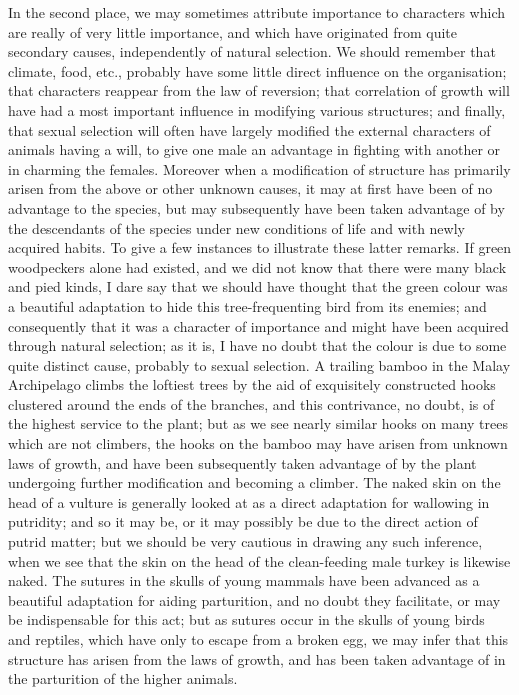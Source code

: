In the second place, we may sometimes attribute importance to characters which are really of very little importance, and which have originated from quite secondary causes, independently of natural selection. We should remember that climate, food, etc., probably have some little direct influence on the organisation; that characters reappear from the law of reversion; that correlation of growth will have had a most important influence in modifying various structures; and finally, that sexual selection will often have largely modified the external characters of animals having a will, to give one male an advantage in fighting with another or in charming the females. Moreover when a modification of structure has primarily arisen from the above or other unknown causes, it may at first have been of no advantage to the species, but may subsequently have been taken advantage of by the descendants of the species under new conditions of life and with newly acquired habits.
To give a few instances to illustrate these latter remarks. If green woodpeckers alone had existed, and we did not know that there were many black and pied kinds, I dare say that we should have thought that the green colour was a beautiful adaptation to hide this tree-frequenting bird from its enemies; and consequently that it was a character of importance and might have been acquired through natural selection; as it is, I have no doubt that the colour is due to some quite distinct cause, probably to sexual selection. A trailing bamboo in the Malay Archipelago climbs the loftiest trees by the aid of exquisitely constructed hooks clustered around the ends of the branches, and this contrivance, no doubt, is of the highest service to the plant; but as we see nearly similar hooks on many trees which are not climbers, the hooks on the bamboo may have arisen from unknown laws of growth, and have been subsequently taken advantage of by the plant undergoing further modification and becoming a climber. The naked skin on the head of a vulture is generally looked at as a direct adaptation for wallowing in putridity; and so it may be, or it may possibly be due to the direct action of putrid matter; but we should be very cautious in drawing any such inference, when we see that the skin on the head of the clean-feeding male turkey is likewise naked. The sutures in the skulls of young mammals have been advanced as a beautiful adaptation for aiding parturition, and no doubt they facilitate, or may be indispensable for this act; but as sutures occur in the skulls of young birds and reptiles, which have only to escape from a broken egg, we may infer that this structure has arisen from the laws of growth, and has been taken advantage of in the parturition of the higher animals.
